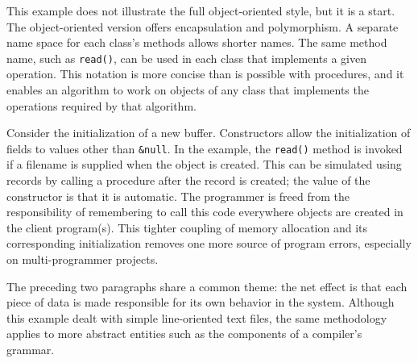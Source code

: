
This example does not illustrate the full object-oriented style, but
it is a start. The object-oriented version offers encapsulation and
polymorphism. A separate name space for each class's methods allows
shorter names. The same method name, such as \texttt{read()}, can be
used in each class that implements a given operation. This notation is
more concise than is possible with procedures, and it enables an
algorithm to work on objects of any class that implements the
operations required by that algorithm.

Consider the initialization of a new buffer. Constructors allow the
initialization of fields to values other than \texttt{\&null}. In the
example, the \texttt{read()} method is invoked if a filename is
supplied when the object is created. This can be simulated using
records by calling a procedure after the record is created; the value
of the constructor is that it is automatic.
The programmer is freed from the responsibility of remembering to call
this code everywhere objects are created in the client program(s). This
tighter coupling of memory allocation and its
corresponding initialization removes one more source of program errors,
especially on multi-programmer projects. 

The preceding two paragraphs share a common theme:
the net effect is that each piece of data is made responsible for its
own behavior in the system. Although this example dealt with simple
line-oriented text files, the same methodology applies to more abstract
entities such as the components of a
compiler's grammar.

